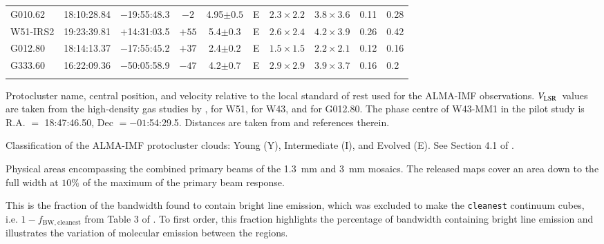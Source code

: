 \documentclass[longauth]{aa} %
\newcommand{\vlsr}{\mbox{$V_{\rm LSR}$\,}}
\newcommand{\cleanest}{\texttt{cleanest}\xspace}
\begin{document}
\begin{table}[htp]
\begin{threeparttable}[c]
\begin{tabular}{lcccccllll}
\hline
G010.62    & 18:10:28.84 & $-$19:55:48.3 & $-2$ & 4.95$\pm 0.5$  & E & $2.3 \times 2.2$     & $3.8 \times 3.6$ &0.11 & 0.28  \\
W51-IRS2  & 19:23:39.81 & $+$14:31:03.5 & $+55$   & 5.4$\pm 0.3$  & E & $2.6 \times 2.4$     & $4.2 \times 3.9$ & 0.26 & 0.42 \\   
G012.80    & 18:14:13.37 & $-$17:55:45.2 & $+37$   & 2.4$\pm 0.2$ & E & $1.5 \times 1.5$    & $2.2 \times 2.1$ &0.12 & 0.16\\         
G333.60  & 16:22:09.36 & $-$50:05:58.9 & $-47$   & 4.2$\pm 0.7$ &  E & $2.9 \times 2.9$    & $3.9 \times 3.7$ & 0.16 & 0.2  \\
\hline \noalign {\smallskip}
\end{tabular}
\begin{tablenotes}
\item[1] Protocluster name, central position, and velocity relative to the local standard of rest used for the ALMA-IMF observations.
$\vlsr$ values are taken from the high-density gas studies by \cite{wienen15}, \cite{ginsburg15} for W51, \cite{nguyen13} for W43, and \cite{immer14} for G012.80. The phase centre of W43-MM1 in the pilot study is R.A.  $=$ 18:47:46.50, Dec $= -01$:54:29.5. Distances are taken from \cite{Motte2022} and references therein.
\item[2] Classification of the ALMA-IMF protocluster clouds: Young (Y), Intermediate (I), and Evolved (E). See Section 4.1 of  \citealt{Motte2022}.  
\item[3] Physical areas encompassing the combined primary beams of the 1.3~mm and 3~mm mosaics. The released maps cover an area down to the full width at $10\%$ of the maximum of the primary beam response.
\item[4] This is the fraction of the bandwidth found to contain bright line emission, which was excluded to make the \cleanest continuum cubes, 
i.e. $1-f_\mathrm{BW,cleanest}$ from Table 3 of \citet{Ginsburg2022}. To first order, this fraction highlights the percentage of bandwidth containing bright line emission and illustrates the variation of molecular emission between the regions.
\end{tablenotes}
\end{threeparttable}
\end{table}
\end{document}

